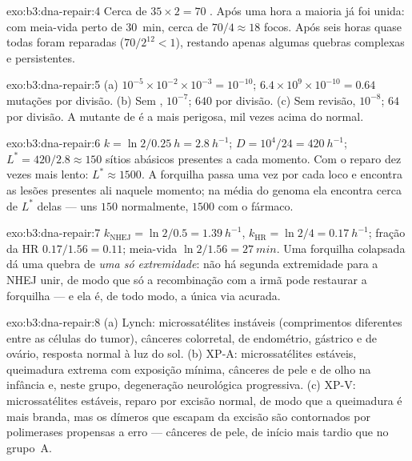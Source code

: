 \begin{solution}{exo:b3:dna-repair:4}
Cerca de $35\times 2 = 70$ . Após uma hora a
maioria já foi unida: com meia-vida perto de \qty{30}{min}, cerca de
$70/4 \approx 18$ focos. Após seis horas quase todas foram reparadas
($70/2^{12} < 1$), restando apenas algumas quebras complexas e
persistentes.
\end{solution}

\begin{solution}{exo:b3:dna-repair:5}
(a) $10^{-5}\times 10^{-2}\times 10^{-3} = 10^{-10}$; $6.4\times
10^{9}\times 10^{-10} = 0.64$ mutações por divisão. (b) Sem , $10^{-7}$; $640$ por divisão. (c) Sem revisão,
$10^{-8}$; $64$ por divisão. A mutante de  é a
mais perigosa, mil vezes acima do normal.
\end{solution}

\begin{solution}{exo:b3:dna-repair:6}
$k = \ln 2/\qty{0.25}{h} = \qty{2.8}{h^{-1}}$; $D = 10^{4}/24 =
\qty{420}{h^{-1}}$; $L^{*} = 420/2.8 \approx 150$ sítios abásicos
presentes a cada momento. Com o reparo dez vezes mais lento:
$L^{*} \approx \num{1500}$. A forquilha passa uma vez por cada loco e
encontra as lesões presentes ali naquele momento; na média do genoma
ela encontra cerca de $L^{*}$ delas --- uns $150$ normalmente,
$\num{1500}$ com o fármaco.
\end{solution}

\begin{solution}{exo:b3:dna-repair:7}
$k_{\text{NHEJ}} = \ln 2/0.5 = \qty{1.39}{h^{-1}}$, $k_{\text{HR}} =
\ln 2/4 = \qty{0.17}{h^{-1}}$; fração da HR $0.17/1.56 = 0.11$;
meia-vida $\ln 2/1.56 = \qty{27}{min}$. Uma forquilha colapsada dá uma
quebra de \emph{uma só extremidade}: não há segunda extremidade para a
NHEJ unir, de modo que só a recombinação com a irmã pode restaurar a
forquilha --- e ela é, de todo modo, a única via acurada.
\end{solution}

\begin{solution}{exo:b3:dna-repair:8}
(a) Lynch: microssatélites instáveis (comprimentos diferentes entre as
células do tumor), cânceres colorretal, de endométrio, gástrico e de
ovário, resposta normal à luz do sol. (b) XP-A: microssatélites
estáveis, queimadura extrema com exposição mínima, cânceres de pele e
de olho na infância e, neste grupo, degeneração neurológica
progressiva. (c) XP-V: microssatélites estáveis, reparo por excisão
normal, de modo que a queimadura é mais branda, mas os dímeros que
escapam da excisão são contornados por polimerases propensas a erro
--- cânceres de pele, de início mais tardio que no grupo~A.
\end{solution}

